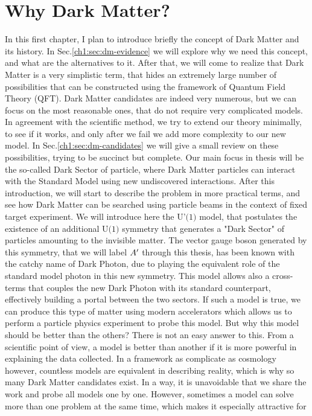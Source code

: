 
\newcommand{\pdirone}{chapters/plots/chapter1}


\chapter{Why Dark Matter?} %

\label{chapter1}

In this first chapter, I plan to introduce briefly the concept of Dark Matter and its history. In Sec.\ref{ch1:sec:dm-evidence} we will explore why we need this concept, and what are the alternatives to it. After that, we will come to realize that Dark Matter is a very simplistic term, that hides an extremely large number of possibilities that can be constructed using the framework of Quantum Field Theory (QFT). Dark Matter candidates are indeed very numerous, but we can focus on the most reasonable ones, that do not require very complicated models. In agreement with the scientific method, we try to extend our theory minimally, to see if it works, and only after we fail we add more complexity to our new model. In Sec.\ref{ch1:sec:dm-candidates} we will give a small review on these possibilities, trying to be succinct but complete. Our main focus in thesis will be the so-called Dark Sector of particle, where Dark Matter particles can interact with the Standard Model using new undiscovered interactions. After this introduction, we will start to describe the problem in more practical terms, and see how Dark Matter can be searched using particle beams in the context of fixed target experiment. We will introduce here the $\textrm{U'(1)}$ model, that postulates the existence of an additional $\textrm{U(1)}$ symmetry that generates a "Dark Sector" of particles amounting to the invisible matter. The vector gauge boson generated by this symmetry, that we will label $A'$ through this thesis, has been known with the catchy name of Dark Photon, due to playing the equivalent role of the standard model photon in this new symmetry. This model allows also a cross-terms that couples the new Dark Photon with its standard counterpart, effectively building a portal between the two sectors. If such a model is true, we can produce this type of matter using modern accelerators which allows us to perform a particle physics experiment to probe this model. But why this model should be better than the others? There is not an easy answer to this. From a scientific point of view, a model is better than another if it is more powerful in explaining the data collected. In a framework as complicate as cosmology however, countless models are equivalent in describing reality, which is why so many Dark Matter candidates exist. In a way, it is unavoidable that we share the work and probe all models one by one. However, sometimes a model can solve more than one problem at the same time, which makes it especially attractive for 